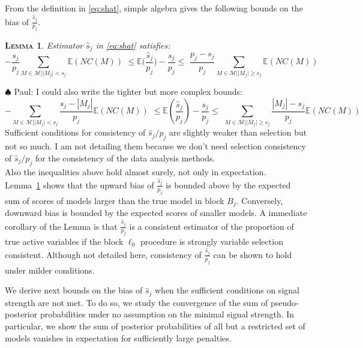 \documentclass[aos]{imsart}
\theoremstyle{plain}
\newtheorem{lem}{\textsc{Lemma}}[section]
\newcommand{\paul}[1]{{\small{\color{green} \sf $\spadesuit$ Paul: #1}}}
\newcommand{\E}{\mathbb{E}}
\begin{document}
From the definition in \eqref{eq:shat}, simple algebra gives the following bounds  on the bias of $\frac{\widehat{s}_j}{p_j}$.
\begin{lem}\label{lem:shatconsistence}
 Estimator $\widehat{s}_j$ in \eqref{eq:shat} satisfies:$$- \frac{s_j}{p_j}\sum_{M \in \mathcal{M} | |M_j| < s_j}\E(NC(M)) \,\, \leq \E\Big(\frac{\widehat{s}_j}{p_j}\Big)-\frac{s_j}{p_j}\leq \,\,\frac{p_j-s_j}{p_j}\sum_{M \in \mathcal{M} | |M_j| \geq s_j}\E(NC(M))$$

\end{lem}
\paul{I could also write the tighter but more complex bounds:
$$- \sum_{M \in \mathcal{M} | |M_j| < s_j}\frac{s_j-|M_j|}{p_j}\E(NC(M)) \,\, \leq \E(\frac{\widehat{s}_j}{p_j})-\frac{s_j}{p_j}\leq \,\,\sum_{M \in \mathcal{M} | |M_j| \geq s_j}\frac{|M_j|-s_j}{p_j}\E(NC(M))$$
Sufficient conditions for consistency of $\hat{s}_j/p_j$ are slightly weaker than selection but not so much.
I am not detailing them because we don't need selection consistency of $\hat{s}_j/p_j$ for the consistency of the data analysis methods.\\
Also the inequalities above hold almost surely, not only in expectation.\\}
Lemma~\ref{lem:shatconsistence} shows that the upward bias of $\frac{\widehat{s}_j}{p_j}$ is bounded above by the expected sum of scores of models larger than the true model in block $B_j$. Conversely, downward bias is bounded by the expected scores of smaller models. A immediate corollary of the Lemma is that $\frac{\widehat{s}_j}{p_j}$ is a consistent estimator of the proportion of true active variables if the block $\ell_0$ procedure is strongly variable selection consistent. Although not detailed here, consistency of $\frac{\widehat{s}_j}{p_j}$ can be shown to hold under milder conditions.

We derive next bounds on the bias of $\widehat{s}_j$ when the sufficient conditions on signal strength are not met. To do so, we study the convergence of the sum of pseudo-posterior probabilities under no assumption on the minimal signal strength. In particular, we show the sum of posterior probabilities of all but a restricted set  of models vanishes in expectation for sufficiently large penalties. 
\end{document}
